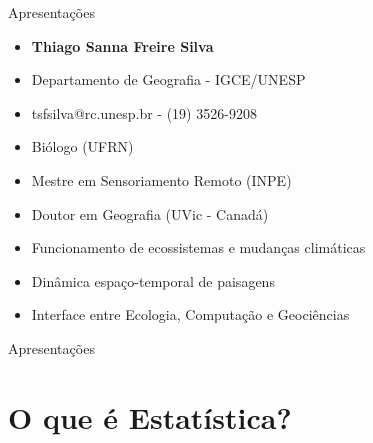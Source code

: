 \documentclass{beamer}\usepackage[]{graphicx}\usepackage[]{color}
\begin{document}
\begin{frame}{Apresentações}

  \begin{itemize}
    \item{\textbf{Thiago Sanna Freire Silva}}
    \item{Departamento de Geografia - IGCE/UNESP}
    \item{tsfsilva@rc.unesp.br - (19) 3526-9208}
  \end{itemize}
  
  \vfill
  
  \begin{itemize}
    \item{Biólogo (UFRN)}
    \item{Mestre em Sensoriamento Remoto (INPE)}
    \item{Doutor em Geografia (UVic - Canadá)}
  \end{itemize}
  
  \vfill
  
  \begin{itemize}
      \item{Funcionamento de ecossistemas e mudanças climáticas}
      \item{Dinâmica espaço-temporal de paisagens}
      \item{Interface entre Ecologia, Computação e Geociências}
      
  \end{itemize}
  
\end{frame}

\begin{frame}{Apresentações}

\vfill


\vfill

\end{frame}

\section{O que é Estatística?}
\end{document}
